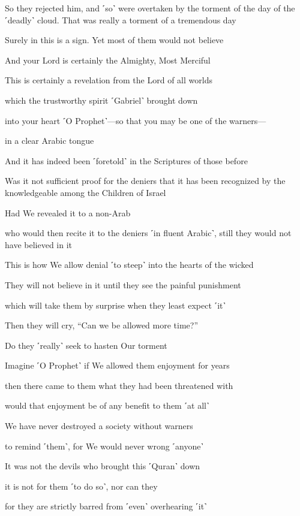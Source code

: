 So they rejected him, and ˹so˺ were overtaken by the torment of the day of the ˹deadly˺ cloud. That was really a torment of a tremendous day

Surely in this is a sign. Yet most of them would not believe

And your Lord is certainly the Almighty, Most Merciful

This is certainly a revelation from the Lord of all worlds

which the trustworthy spirit ˹Gabriel˺ brought down

into your heart ˹O Prophet˺—so that you may be one of the warners—

in a clear Arabic tongue

And it has indeed been ˹foretold˺ in the Scriptures of those before

Was it not sufficient proof for the deniers that it has been recognized by the knowledgeable among the Children of Israel

Had We revealed it to a non-Arab

who would then recite it to the deniers ˹in fluent Arabic˺, still they would not have believed in it

This is how We allow denial ˹to steep˺ into the hearts of the wicked

They will not believe in it until they see the painful punishment

which will take them by surprise when they least expect ˹it˺

Then they will cry, “Can we be allowed more time?”

Do they ˹really˺ seek to hasten Our torment

Imagine ˹O Prophet˺ if We allowed them enjoyment for years

then there came to them what they had been threatened with

would that enjoyment be of any benefit to them ˹at all˺

We have never destroyed a society without warners

to remind ˹them˺, for We would never wrong ˹anyone˺

It was not the devils who brought this ˹Quran˺ down

it is not for them ˹to do so˺, nor can they

for they are strictly barred from ˹even˺ overhearing ˹it˺

